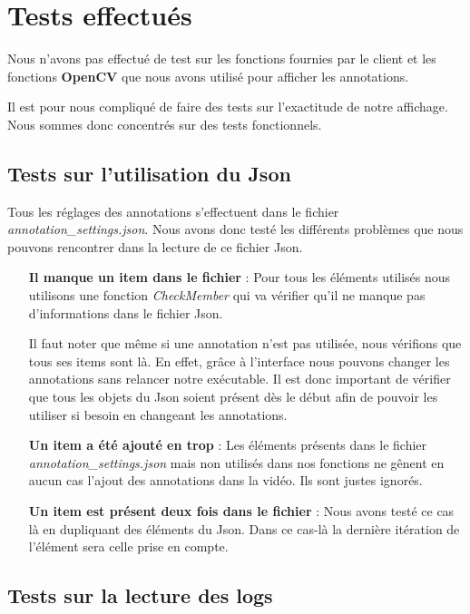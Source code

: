 \chapter{Tests effectués}

Nous n'avons pas effectué de test sur les fonctions fournies par
le client et les fonctions \textbf{OpenCV} que nous avons utilisé
pour afficher les annotations.

Il est pour nous compliqué de faire des tests sur l'exactitude de
notre affichage. Nous sommes donc concentrés sur des tests
fonctionnels.

\section{Tests sur l'utilisation du Json}

Tous les réglages des annotations s'effectuent dans le fichier \\
\textit{annotation\_settings.json}. Nous avons donc testé les
différents problèmes que nous pouvons rencontrer dans la lecture
de ce fichier Json.
\bigskip

\begin{itemize}
    \item [\textbf{Il manque un item dans le fichier}] : Pour
    tous les éléments utilisés nous utilisons une fonction
    \textit{CheckMember} qui va vérifier qu'il ne manque pas
    d'informations dans le fichier Json.
    
    Il faut noter que même si une annotation n'est pas utilisée,
    nous vérifions que tous ses items sont là. En effet, grâce à
    l'interface nous pouvons changer les annotations sans
    relancer notre exécutable. Il est donc important de vérifier
    que tous les objets du Json soient présent dès le début afin
    de pouvoir les utiliser si besoin en changeant les
    annotations.
    \item [\textbf{Un item a été ajouté en trop}] : Les éléments
    présents dans le fichier \textit{annotation\_settings.json}
    mais non utilisés dans nos fonctions ne gênent en aucun cas
    l'ajout des annotations dans la vidéo. Ils sont justes
    ignorés.
    \item [\textbf{Un item est présent deux fois dans le
    fichier}] : Nous avons testé ce cas là en dupliquant des
    éléments du Json. Dans ce cas-là la dernière itération de
    l'élément sera celle prise en compte.
\end{itemize}

\section{Tests sur la lecture des logs}

